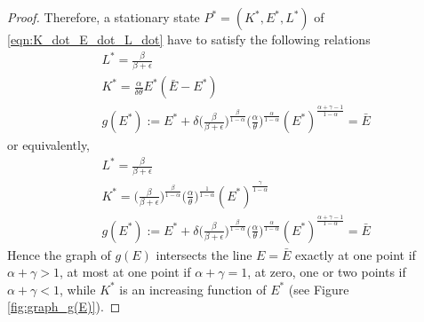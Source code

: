 \begin{proof}
	
	Therefore, a stationary state $P^*=(K^*,E^*,L^*)$ of \eqref{eqn:K_dot_E_dot_L_dot} have to satisfy the following relations 
	\begin{equation} 
		\begin{split}
			&L^* = \frac{\beta}{\beta+\epsilon}\\
			&K^* = \frac{\alpha}{\delta\theta}E^*(\bar{E}-E^*) \\
			&g(E^*):=E^*+ \delta\Big(\frac{\beta}{\beta+\epsilon}\Big)^{\frac{\beta}{1-\alpha}} \Big(\frac{\alpha}{\theta}\Big)^{\frac{\alpha}{1-\alpha}} {(E^*)}^{\frac{\alpha+\gamma-1}{1-\alpha}} =\bar{E}
		\end{split}
	\end{equation}
	or equivalently,
	\begin{equation} \label{eqn:fixed_pnt_satisfy}
		\begin{split}
			&L^* = \frac{\beta}{\beta+\epsilon}\\
			&K^* = \Big(\frac{\beta}{\beta+\epsilon}\Big)^{\frac{\beta}{1-\alpha}} \Big(\frac{\alpha}{\theta}\Big)^{\frac{1}{1-\alpha}}{(E^*)}^{\frac{\gamma}{1-\alpha}} \\
			&g(E^*):=E^*+ \delta\Big(\frac{\beta}{\beta+\epsilon}\Big)^{\frac{\beta}{1-\alpha}} \Big(\frac{\alpha}{\theta}\Big)^{\frac{\alpha}{1-\alpha}} {(E^*)}^{\frac{\alpha+\gamma-1}{1-\alpha}} =\bar{E}
		\end{split}
	\end{equation}
	Hence the graph of $g(E)$ intersects the line $E=\bar{E}$ exactly at one point if $\alpha+\gamma>1$, at most at one point if $\alpha+\gamma=1$, at zero, one or two points if $\alpha+\gamma<1$, while $K^*$ is an increasing function of $E^*$ (see Figure \ref{fig:graph_g(E)}).  
\end{proof}

